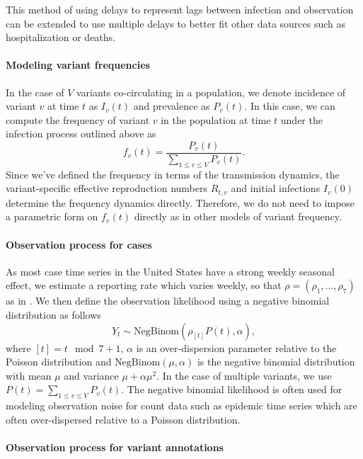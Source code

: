 \documentclass[11pt,oneside,letterpaper]{article}
\begin{document}
This method of using delays to represent lags between infection and observation can be extended to use multiple delays to better fit other data sources such as hospitalization or deaths.

\paragraph{Modeling variant frequencies}%

In the case of $V$ variants co-circulating in a population, we denote incidence of variant $v$ at time $t$ as $I_{v}(t)$ and prevalence as $P_{v}(t)$.
In this case, we can compute the frequency of variant $v$ in the population at time $t$ under the infection process outlined above as
\begin{equation}
  f_{v}(t) = \frac{P_{v}(t)}{ \sum_{1\leq v \leq V} P_{v}(t)}.
\end{equation}
Since we've defined the frequency in terms of the transmission dynamics, the variant-specific effective reproduction numbers $R_{t,v}$ and initial infections $I_{v}(0)$ determine the frequency dynamics directly.
Therefore, we do not need to impose a parametric form on $f_{v}(t)$ directly as in other models of variant frequency.

\paragraph{Observation process for cases}%

As most case time series in the United States have a strong weekly seasonal effect, we estimate a reporting rate which varies weekly, so that $\rho = (\rho_{1}, \ldots, \rho_{7})$ as in \cite{Abbott2020}.
We then define the observation likelihood using a negative binomial distribution as follows
\begin{equation}
  Y_{t} \sim \text{NegBinom}(\rho_{[t]} P(t),  \alpha),
\end{equation}
where $[t] = t \mod 7 + 1$, $\alpha$ is an over-dispersion parameter relative to the Poisson distribution and $\text{NegBinom}(\mu, \alpha)$ is the negative binomial distribution with mean $\mu$ and variance  $\mu + \alpha\mu^{2}$. In the case of multiple variants, we use $P(t) = \sum_{1\leq v \leq V} P_{v}(t)$.
The negative binomial likelihood is often used for modeling observation noise for count data such as epidemic time series which are often over-dispersed relative to a Poisson distribution.

\paragraph{Observation process for variant annotations}%
\end{document}
